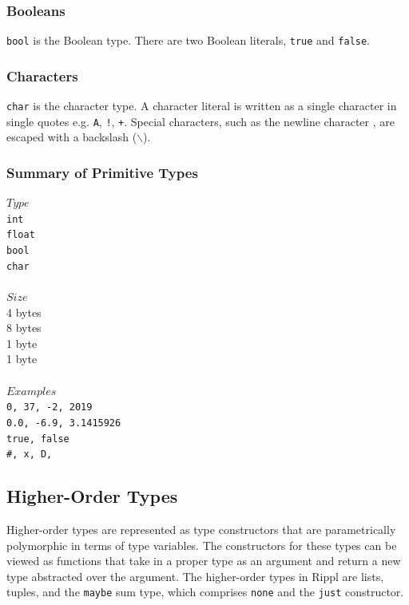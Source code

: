\documentclass[5pt]{article}
\newcommand{\sq}{\textquotesingle}
\begin{document}
\subsubsection{Booleans}
\texttt{bool} is the Boolean type. There are two Boolean literals, \texttt{true} and \texttt{false}.
\subsubsection{Characters}
\texttt{char} is the character type. A character literal is written as a single character in single quotes e.g. \texttt{\sq A\sq}, \texttt{\sq !\sq}, \texttt{\sq+\sq}. Special characters, such as the newline character \sq\texttt{\string\n}\sq, are escaped with a backslash ($\backslash$).
\pagebreak
\subsubsection{Summary of Primitive Types}
\begin{multicols}{3}
$Type$ \\
\hspace*{5mm} \texttt{int} \\
\hspace*{5mm} \texttt{float} \\
\hspace*{5mm} \texttt{bool} \\
\hspace*{5mm} \texttt{char} \\
\columnbreak \\
$Size$ \\
4 bytes \\
8 bytes \\
1 byte \\
1 byte \\
\columnbreak \\
$Examples$ \\
\texttt{0, 37, -2, 2019} \\
\texttt{0.0, -6.9, 3.1415926} \\
\texttt{true, false} \\
\texttt{\sq\#\sq, \sq x\sq, \sq D\sq, \sq \string\n \sq }  \\
\end{multicols}

\subsection{Higher-Order Types}
Higher-order types are represented as type constructors that are parametrically polymorphic in terms of type variables. The constructors for these types can be viewed as functions that take in a proper type as an argument and return a new type abstracted over the argument. The higher-order types in Rippl are lists, tuples, and the \texttt{maybe} sum type, which comprises \texttt{none} and the \texttt{just} constructor.
\end{document}
